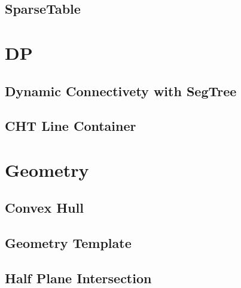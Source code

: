 \subsection{SparseTable}
\vspace{-2ex}
\raggedbottom
\vspace{-3.2ex}
\hrulefill

\section{DP}
\subsection{Dynamic Connectivety with SegTree}
\vspace{-2ex}
\raggedbottom
\vspace{-3.2ex}
\hrulefill
\subsection{CHT Line Container}
\vspace{-2ex}
\raggedbottom
\vspace{-3.2ex}
\hrulefill

\section{Geometry}
\subsection{Convex Hull}
\vspace{-2ex}
\raggedbottom
\vspace{-3.2ex}
\hrulefill
\subsection{Geometry Template}
\vspace{-2ex}
\raggedbottom
\vspace{-3.2ex}
\hrulefill
\subsection{Half Plane Intersection}
\vspace{-2ex}
\raggedbottom
\vspace{-3.2ex}
\hrulefill
